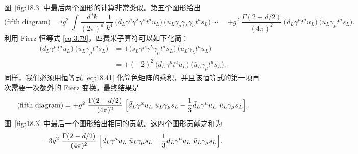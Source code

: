 图~\ref{fig:18.3} 中最后两个图形的计算非常类似。第五个图形给出
\begin{equation}
  \text{(fifth diagram)} = ig^2\ \int \frac{d^dk}{(2\pi)^d}\ \frac{1}{k^4}\
    \bigl( \bar{d}_L\gamma^\rho\gamma^\lambda\gamma^\sigma t^a u_L \bigr)\
    \bigl( \bar{u}_L\gamma_\rho\gamma_\lambda\gamma_\sigma t^a s_L \bigr)\
    \cdots = +g^2\ \frac{\Gamma(2-d/2)}{(4\pi)^2}\ \bigl( \bar{d}_L\gamma^\mu
    t^a u_L \bigr)\ \bigl( \bar{u}_L\gamma_\mu t^a s_L \bigr) .
  \label{eq:18.45}
\end{equation}
利用 Fierz 恒等式 \eqref{eq:3.79}，四费米子算符可以如下化简：
\begin{equation}
  \begin{aligned}
    \bigl( \bar{d}_L\gamma^\mu t^a u_L \bigr)\ \bigl( \bar{u}_L\gamma_\mu
      t^a s_L \bigr) &= +\bigl( \bar{s}_L\gamma^\mu\gamma^\lambda\gamma_\mu
      t^a s_L \bigr)\ \bigl( \bar{u}_L\gamma_\lambda t^a u_L \bigr)\\
    &= +(-2)^2\ \bigl( \bar{d}_L\gamma^\mu t^a u_L \bigr)\ \bigl(
      \bar{u}_L\gamma_\mu t^a s_L \bigr) .
  \end{aligned}
  \label{eq:18.46}
\end{equation}
同样，我们必须用恒等式 \eqref{eq:18.41} 化简色矩阵的乘积，并且该恒等式的第一项再次需要一次额外的 Fierz 变换。最终结果是
\begin{equation}
  \text{(fifth diagram)} = +g^2\ \frac{\Gamma(2-d/2)}{(4\pi)^2}\ \Bigl[
    \bar{d}_L\gamma^\mu u_L\ \bar{u}_L\gamma_\mu s_L
    - \frac{1}{3}\bar{d}_L\gamma^\mu u_L\ \bar{u}_L\gamma_\mu s_L
    \Bigr] .
  \label{eq:18.47}
\end{equation}
图~\ref{fig:18.3} 中最后一个图形给出相同的贡献。这四个图形贡献之和为
\begin{equation}
  -3g^2\ \frac{\Gamma(2-d/2)}{(4\pi)^2}\ \Bigl[ \bar{d}_L\gamma^\mu u_L\
    \bar{u}_L\gamma_\mu s_L - \frac{1}{3}\bar{d}_L\gamma^\mu u_L\
      \bar{u}_L\gamma_\mu s_L \Bigr] .
  \label{eq:18.48}
\end{equation}

